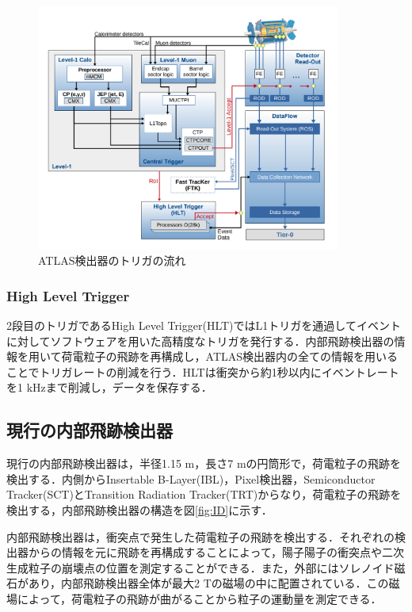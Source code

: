 \begin{figure}[h]
  \centering
  \includegraphics[width=10cm]{./figure/ATLAStrigger.png}
  \caption{ATLAS検出器のトリガの流れ\cite{Aaboud:2016leb}}
  \label{fig:ATLAStrigger}
\end{figure}


\subsubsection*{High Level Trigger}
2段目のトリガであるHigh Level Trigger(HLT)ではL1トリガを通過してイベントに対してソフトウェアを用いた高精度なトリガを発行する．内部飛跡検出器の情報を用いて荷電粒子の飛跡を再構成し，ATLAS検出器内の全ての情報を用いることでトリガレートの削減を行う．HLTは衝突から約1秒以内にイベントレートを1 $\mathrm{kHz}$まで削減し，データを保存する．

\subsection{現行の内部飛跡検出器}
現行の内部飛跡検出器は，半径1.15 $\mathrm{m}$，長さ7 $\mathrm{m}$の円筒形で，荷電粒子の飛跡を検出する．内側からInsertable B-Layer(IBL)，Pixel検出器，Semiconductor Tracker(SCT)とTransition Radiation Tracker(TRT)からなり，荷電粒子の飛跡を検出する，内部飛跡検出器の構造を図\ref{fig:ID}に示す．\par
内部飛跡検出器は，衝突点で発生した荷電粒子の飛跡を検出する．それぞれの検出器からの情報を元に飛跡を再構成することによって，陽子陽子の衝突点や二次生成粒子の崩壊点の位置を測定することができる．また，外部にはソレノイド磁石があり，内部飛跡検出器全体が最大2 $\mathrm{T}$の磁場の中に配置されている．この磁場によって，荷電粒子の飛跡が曲がることから粒子の運動量を測定できる．\par


